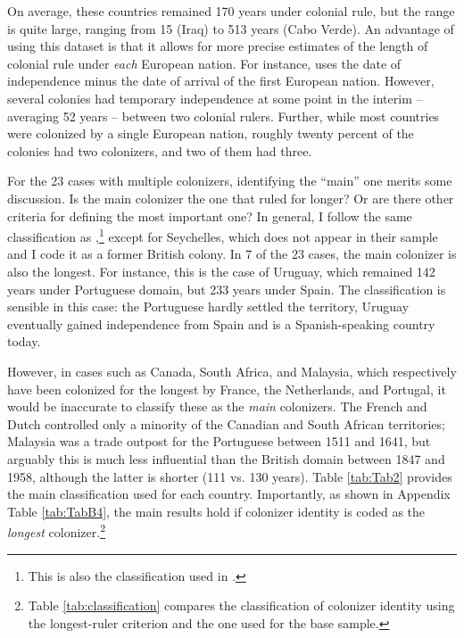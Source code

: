 \documentclass[a4paper,12pt]{article}
\begin{document}
On average, these countries remained 170 years under colonial rule, but the range is quite large, ranging from 15 (Iraq) to 513 years (Cabo Verde). An advantage of using this dataset is that it allows for more precise estimates of the length of colonial rule under \textit{each} European nation. For instance, \cite{grier1999colonial} uses the date of independence minus the date of arrival of the first European nation. However, several colonies had temporary independence at some point in the interim -- averaging 52 years -- between two colonial rulers. Further, while most countries were colonized by a single European nation, roughly twenty percent of the colonies had two colonizers, and two of them had three. 

For the 23 cases with multiple colonizers, identifying the ``main'' one merits some discussion. Is the main colonizer the one that ruled for longer? Or are there other criteria for defining the most important one? In general, I follow the same classification as \cite{laporta1999quality},\footnote{This is also the classification used in \cite{Acemoglu2001,acemoglu2002reversal}.} except for Seychelles, which does not appear in their sample and I code it as a former British colony. In 7 of the 23 cases, the main colonizer is also the longest. For instance, this is the case of Uruguay, which remained 142 years under Portuguese domain, but 233 years under Spain. The classification is sensible in this case: the Portuguese hardly settled the territory, Uruguay eventually gained independence from Spain and is a Spanish-speaking country today. 

However, in cases such as Canada, South Africa, and Malaysia, which respectively have been colonized for the longest by France, the Netherlands, and Portugal, it would be inaccurate to classify these as the \textit{main} colonizers. The French and Dutch controlled only a minority of the Canadian and South African territories; Malaysia was a trade outpost for the Portuguese between 1511 and 1641, but arguably this is much less influential than the British domain between 1847 and 1958, although the latter is shorter (111 vs. 130 years). Table \ref{tab:Tab2} provides the main classification used for each country. Importantly, as shown in Appendix Table \ref{tab:TabB4}, the main results hold if colonizer identity is coded as the \textit{longest} colonizer.\footnote{Table \ref{tab:classification} compares the classification of colonizer identity using the longest-ruler criterion and the one used for the base sample.}
\end{document}
